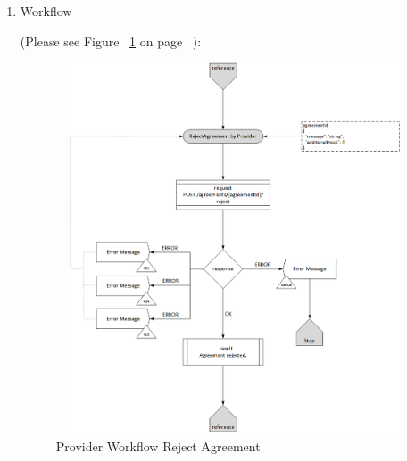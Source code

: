 \begin{enumerate}
\item Workflow

(Please see Figure ~\ref{fig:PRA} on page ~\pageref{fig:PRA}):

\begin{figure}[htbp]
    \centering
    \includegraphics[width=11cm,height=11cm,angle=0]{./diag/Workflow/Market/RejectAgreement-P-Workflow.png}
    \caption{Provider Workflow Reject Agreement  }
	\label{fig:PRA}
\end{figure}

\end{enumerate}

\newpage

